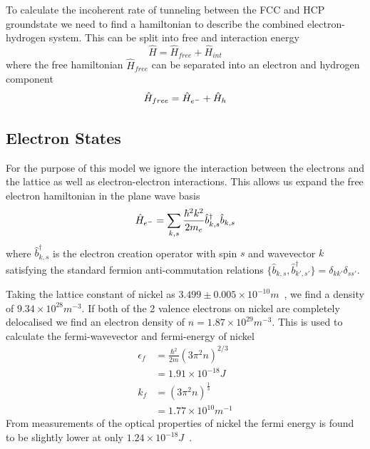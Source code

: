 To calculate the incoherent
rate of tunneling between
the FCC and HCP groundstate
we need to find a
hamiltonian to describe the combined
electron-hydrogen system.
This can be split into free and interaction energy
\begin{equation}
    \hat{H} = \hat{H}_{free} + \hat{H}_{int}
\end{equation}
where the free hamiltonian \(\hat{H}_{free}\)
can be separated
into an electron and hydrogen component
\begin{equation}
    \hat{H}_{free} =
    \hat{H}_{e^-} + \hat{H}_{h}\\
\end{equation}

\subsection{Electron States}\label{sec:electron states}
For the purpose of this model we ignore the
interaction between the electrons
and the lattice as well as electron-electron
interactions. This allows
us expand the free electron
hamiltonian in the plane wave
basis
\begin{equation}
    \hat{H}_{e^-} = \sum_{k, s}
    \frac{\hbar^2 k^2}{2m_e} \hat{b}^\dagger_{k, s} \hat{b}_{k, s}\\
\end{equation}
where \(\hat{b}^\dagger_{k, s}\)
is the electron creation operator
with spin \(s\) and wavevector
\(k\) satisfying the standard
fermion anti-commutation relations
\( \{ \hat{b}_{k, s}, \hat{b}^\dagger_{k', s'} \}
= \delta_{k k'} \delta_{s s'}\).

Taking the lattice constant of nickel as
\(3.499\pm{}0.005\times{}10^{-10}m\)~\cite{PhysRev.25.753},
we find a density of
\(9.34\times{}10^{28}m^{-3}\).
If both of the 2 valence
electrons on nickel are completely
delocalised we
find an electron density of
\(n = 1.87\times{}10^{29} m^{-3}\).
This is used to calculate
the fermi-wavevector and fermi-energy of
nickel~\cite{KittelCharles1953Itss}
\begin{align}
    \epsilon_f & = \frac{\hbar^2}{2m} {(3\pi^2n)}^{2/3}                   \\
               & = 1.91\times{}10^{-18}J                                  \\
    k_f        & = {(3 \pi^2 n)}^{\frac{1}{3}}                            \\
               & = 1.77\times{}10^{10}m^{-1} \label{eqn:fermi wavevector}
\end{align}
From measurements of the optical
properties of nickel the
fermi energy is found to
be slightly lower
at only
\(1.24\times{} 10^{-18}J\)~\cite{PhysRev.131.2469}.

